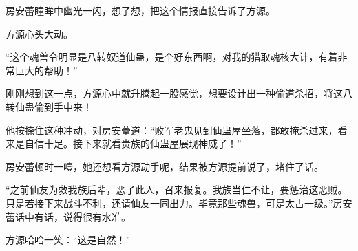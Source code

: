 \begin{this_body}
房安蕾瞳眸中幽光一闪，想了想，把这个情报直接告诉了方源。

方源心头大动。

“这个魂兽令明显是八转奴道仙蛊，是个好东西啊，对我的猎取魂核大计，有着非常巨大的帮助！”

刚刚想到这一点，方源心中就升腾起一股感觉，想要设计出一种偷道杀招，将这八转仙蛊偷到手中来！

他按捺住这种冲动，对房安蕾道：“败军老鬼见到仙蛊屋坐落，都敢掩杀过来，看来是自信十足。接下来就看贵族的仙蛊屋展现神威了！”

房安蕾顿时一噎，她还想看方源动手呢，结果被方源提前说了，堵住了话。

“之前仙友为救我族后辈，恶了此人，召来报复。我族当仁不让，要惩治这恶贼。只是若接下来战斗不利，还请仙友一同出力。毕竟那些魂兽，可是太古一级。”房安蕾话中有话，说得很有水准。

方源哈哈一笑：“这是自然！”

\end{this_body}

